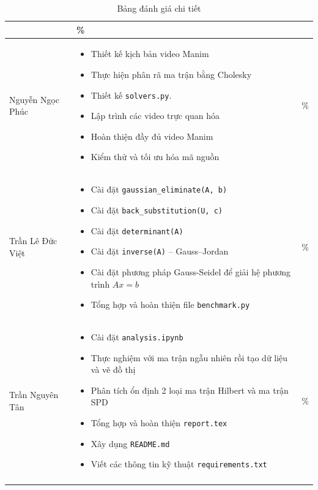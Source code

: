 \documentclass[a4paper]{article}
\begin{document}
\begin{longtable}{|>{\raggedright\arraybackslash}p{}|>{\raggedright\arraybackslash}p{}|>{\centering\arraybackslash}p{}|}
\begin{itemize}[leftmargin=*, noitemsep, topsep=0pt, partopsep=0pt]
                    \end{itemize} & 100\% \\ \hline
Nguyễn Ngọc Phúc     & \begin{itemize}[leftmargin=*, noitemsep, topsep=0pt, partopsep=0pt]
                        \item Thiết kế kịch bản video Manim
                        \item Thực hiện phân rã ma trận bằng Cholesky
                        \item Thiết kế \texttt{solvers.py}.
                        \item Lập trình các video trực quan hóa
                        \item Hoàn thiện đầy đủ video Manim
                        \item Kiểm thử và tối ưu hóa mã nguồn
                    \end{itemize} & 100\% \\ \hline
Trần Lê Đức Việt   & \begin{itemize}[leftmargin=*, noitemsep, topsep=0pt, partopsep=0pt]
                        \item Cài đặt \texttt{gaussian\_eliminate(A, b)}
                        \item Cài đặt \texttt{back\_substitution(U, c)}
                        \item Cài đặt \texttt{determinant(A)}
                        \item Cài đặt \texttt{inverse(A)} -- Gauss--Jordan
                        \item Cài đặt phương pháp Gauss-Seidel để giải hệ phương trình $Ax = b$
                        \item Tổng hợp và hoàn thiện file \texttt{benchmark.py} 
                    \end{itemize} & 100\% \\ \hline
Trần Nguyên Tân   & \begin{itemize}[leftmargin=*, noitemsep, topsep=0pt, partopsep=0pt]
                        \item Cài đặt \texttt{analysis.ipynb}
                        \item Thực nghiệm với ma trận ngẫu nhiên rồi tạo dữ liệu và vẽ đồ thị
                        \item Phân tích ổn định 2 loại ma trận Hilbert và ma trận SPD
                        \item Tổng hợp và hoàn thiện \texttt{report.tex}
                        \item Xây dụng \texttt{README.md}
                        \item Viết các thông tin kỹ thuật \texttt{requirements.txt}
                    \end{itemize} & 100\% \\ \hline
\caption{Bảng đánh giá chi tiết}\\
\end{longtable}
\endgroup
\end{document}

